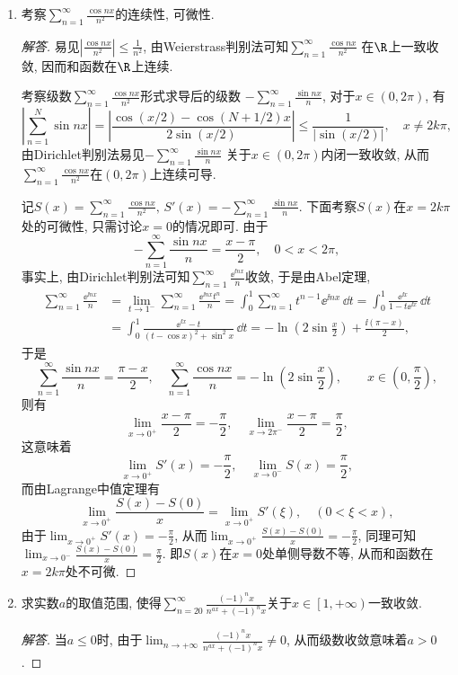 \begin{quiza}
\begin{enumerate}
\item 考察\(\sum_{n=1}^{\infty}\frac{\cos nx}{n^2}\)的连续性, 可微性.
\begin{proof}[解答]
易见\(\left|\frac{\cos nx}{n^2}\right|\leqslant\frac{1}{n^2}\), 
由Weierstrass判别法可知\(\sum_{n=1}^{\infty}\frac{\cos nx}{n^2}\)
在\(\R\)上一致收敛, 因而和函数在\(\R\)上连续.

考察级数\(\sum_{n=1}^{\infty}\frac{\cos nx}{n^2}\)形式求导后的级数
\(-\sum_{n=1}^{\infty}\frac{\sin nx}{n}\), 对于\(x\in(0,2\pi)\), 有
\[\left|\sum_{n=1}^{N}\sin nx\right|
=\left|\frac{\cos(x/2)-\cos(N+1/2)x}{2\sin(x/2)}\right|
\leqslant\frac{1}{|\sin(x/2)|},\quad x\ne 2k\pi,\]
由Dirichlet判别法易见\(-\sum_{n=1}^{\infty}\frac{\sin nx}{n}\)
关于\(x\in(0,2\pi)\)内闭一致收敛, 
从而\(\sum_{n=1}^{\infty}\frac{\cos nx}{n^2}\)在\((0,2\pi)\)上连续可导. 

记\(S(x)=\sum_{n=1}^{\infty}\frac{\cos nx}{n^2},\,S'(x)=-\sum_{n=1}^{\infty}\frac{\sin nx}{n}\). 
下面考察\(S(x)\)在\(x=2k\pi\)处的可微性, 只需讨论\(x=0\)的情况即可. 由于
\[-\sum_{n=1}^{\infty}\frac{\sin nx}{n}=\frac{x-\pi}{2},\quad 0<x<2\pi,\]
事实上, 由Dirichlet判别法可知\(\sum_{n=1}^{\infty}\frac{\ee^{\ii nx}}{n}\)收敛, 于是由Abel定理,\[\begin{split}
\sum_{n=1}^{\infty}\frac{\ee^{\ii nx}}{n}
&=\lim_{t\rightarrow 1^-}\sum_{n=1}^{\infty}\frac{\ee^{\ii nx}t^n}{n}
=\int_{0}^{1}\sum_{n=1}^{\infty}t^{n-1}\ee^{\ii nx}\,\dd t
=\int_{0}^{1}\frac{\ee^{\ii x}}{1-t\ee^{\ii x}}\,\dd t\\
&=\int_{0}^{1}\frac{\ee^{\ii x}-t}{(t-\cos x)^2+\sin^2x}\,\dd t
=-\ln\left(2\sin\frac{x}{2}\right)+\frac{\ii(\pi-x)}{2},
\end{split}\]于是\[\sum_{n=1}^{\infty}\frac{\sin nx}{n}=\frac{\pi-x}{2},
\quad\sum_{n=1}^{\infty}\frac{\cos nx}{n}=-\ln\left(2\sin\frac{x}{2}\right),
\qquad x\in\left(0,\frac{\pi}{2}\right),\]
则有\[\lim_{x\rightarrow 0^+}\frac{x-\pi}{2}=-\frac{\pi}{2},\quad \lim_{x\rightarrow 2\pi^-}\frac{x-\pi}{2}=\frac{\pi}{2},\]
这意味着\[\lim_{x\rightarrow 0^+}S'(x)=-\frac{\pi}{2},\quad \lim_{x\rightarrow 0^-}S(x)=\frac{\pi}{2},\]
而由Lagrange中值定理有\[\lim_{x\rightarrow 0^+}\frac{S(x)-S(0)}{x}
=\lim_{x\rightarrow 0^+}S'(\xi),\quad \left(0<\xi<x\right),\]
由于\(\lim_{x\rightarrow 0^+}S'(x)=-\frac{\pi}{2}\), 
从而\(\lim_{x\rightarrow0^+}\frac{S(x)-S(0)}{x}=-\frac{\pi}{2}\), 
同理可知\(\lim_{x\rightarrow0^-}\frac{S(x)-S(0)}{x}=\frac{\pi}{2}\). 
即\(S(x)\)在\(x=0\)处单侧导数不等, 从而和函数在\(x=2k\pi\)处不可微.
\end{proof}
\item 求实数\(a\)的取值范围,  使得\(\sum_{n=20}^{\infty}\frac{(-1)^nx}{n^{ax}+(-1)^nx}\)关于\(x\in\left[1,+\infty\right)\)一致收敛.
\begin{proof}[解答]
当\(a\leqslant 0\)时, 由于\(\lim_{n\rightarrow+\infty}\frac{(-1)^nx}{n^{ax}+(-1)^nx}\ne 0\), 从而级数收敛意味着\(a>0\).


\end{proof}
\end{enumerate}
\end{quiza}
